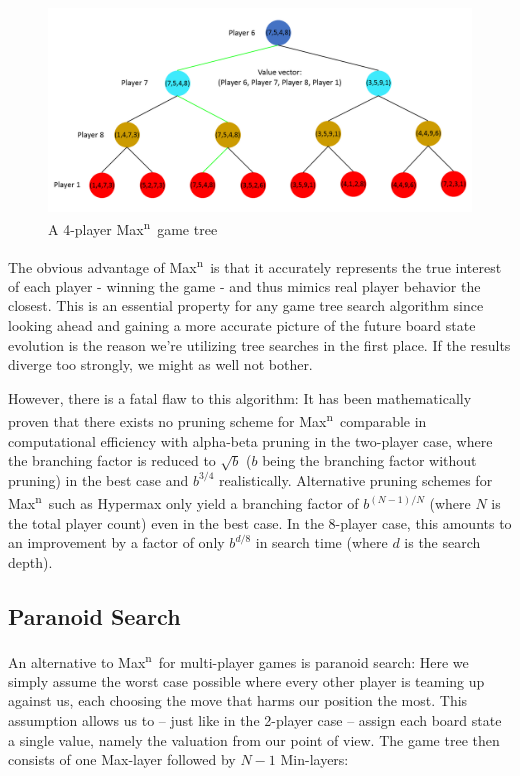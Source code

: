 \documentclass[a4paper,12pt]{article}
\newcommand{\Maxn}{Max\textsuperscript{n}\ }
\begin{document}
\begin{figure}[H]
    \centering
    \includegraphics[width=\textwidth,keepaspectratio]{pictures/assignment3/MaxnTree.png}
    \caption{A 4-player \Maxn game tree}
\end{figure}

The obvious advantage of \Maxn is that it accurately represents the true interest of each player - winning the game - and thus mimics real player behavior the closest. This is an essential property for any game tree search algorithm since looking ahead and gaining a more accurate picture of the future board state evolution is the reason we're utilizing tree searches in the first place. If the results diverge too strongly, we might as well not bother.

However, there is a fatal flaw to this algorithm: It has been mathematically proven \cite{multiplayer-alpha-beta} that there exists no pruning scheme for \Maxn comparable in computational efficiency with alpha-beta pruning in the two-player case, where the branching factor is reduced to $\sqrt{b}$ ($b$ being the branching factor without pruning) in the best case and $b^{3/4}$ realistically. Alternative pruning schemes for \Maxn such as Hypermax \cite{n-person-minimax} only yield a branching factor of $b^{(N-1)/N}$ (where $N$ is the total player count) even in the best case. In the 8-player case, this amounts to an improvement by a factor of only $b^{d/8}$ in search time (where $d$ is the search depth).

\subsection{Paranoid Search}
An alternative to \Maxn for multi-player games is paranoid search: Here we simply assume the worst case possible where every other player is teaming up against us, each choosing the move that harms our position the most. This assumption allows us to -- just like in the 2-player case -- assign each board state a single value, namely the valuation from our point of view. The game tree then consists of one Max-layer followed by $N-1$ Min-layers:
\end{document}
